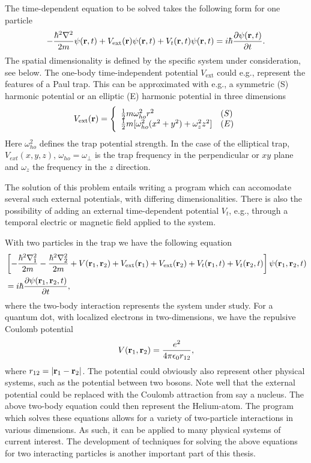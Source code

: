 \begin{enumerate}
The time-dependent equation to be solved takes the following form 
for one particle
\begin{equation}
 -\frac{\hbar^2\nabla^2}{2m}\psi({\bf r},t)
  +V_{\mathrm{ext}}({\bf r})\psi({\bf r},t)+ V_t({\bf r},t)\psi({\bf r},t)= 
  i\hbar \frac{\partial \psi({\bf r},t)}{\partial t}.
\end{equation}
The spatial 
dimensionality is defined by the specific system under consideration, see 
below. The one-body time-independent potential $V_{\mathrm{ext}}$ 
could e.g., represent 
the features of a Paul trap. This can be approximated with e.g., a symmetric
(S) harmonic potential or an elliptic (E) harmonic potential in three dimensions
 \begin{equation}
V_{\mathrm{ext}}({\bf r}) = 
\Bigg\{
\begin{array}{ll}
        \frac{1}{2}m\omega_{ho}^2r^2 & (S)\\
\strut
	\frac{1}{2}m[\omega_{ho}^2(x^2+y^2) + \omega_z^2z^2] & (E)
\label{trap_eqn}
\end{array}
\end{equation}
Here $\omega_{ho}^2$ defines the trap potential strength.  In the case of the
elliptical trap, $V_{ext}(x,y,z)$, $\omega_{ho}=\omega_{\perp}$ is the trap frequency
in the perpendicular or $xy$ plane and $\omega_z$ the frequency in the $z$
direction.

The solution of this problem entails writing a program which can accomodate 
several such external potentials, with differing dimensionalities.
There is also the possibility of adding an external time-dependent potential
$V_t$, e.g., through a temporal electric or magnetic field 
applied to the system.

With two particles in the trap we have the following equation
\begin{eqnarray}
& \left[-\frac{\hbar^2\nabla_1^2}{2m}-\frac{\hbar^2\nabla_2^2}{2m}
  +V({\bf r}_1, {\bf r}_2) + V_{\mathrm{ext}}({\bf r}_1)+V_{\mathrm{ext}}({\bf r}_2)+V_{t}({\bf r}_1,t)+V_{t}({\bf r}_2,t)\right]
   \psi({\bf r}_1, {\bf r}_2,t) \nonumber \\
&=i\hbar \frac{\partial \psi({\bf r}_1, {\bf r}_2,t)}{\partial t},
\end{eqnarray}
where the two-body interaction represents the system under study.
For a quantum dot, with localized electrons in two-dimensions, we have the
repulsive Coulomb potential 
\begin{equation}
 V({\bf r}_1, {\bf r}_2)=\frac{e^2}{4\pi\epsilon_0r_{12}},
\end{equation}
where $r_{12}=|{\bf r}_1-{\bf r}_2|$.
The potential could obviously also represent other physical 
systems, such as the potential between two bosons. 
Note well that the external potential could be replaced with the Coulomb
attraction from say a nucleus. The above two-body equation could then 
represent the Helium-atom.
The program which solves these equations allows for a variety of two-particle
interactions in various dimensions. As such, it can be applied to many 
physical systems of current interest.
The development of techniques for solving the above equations for two 
interacting particles is another important part of this thesis.



\end{enumerate}
